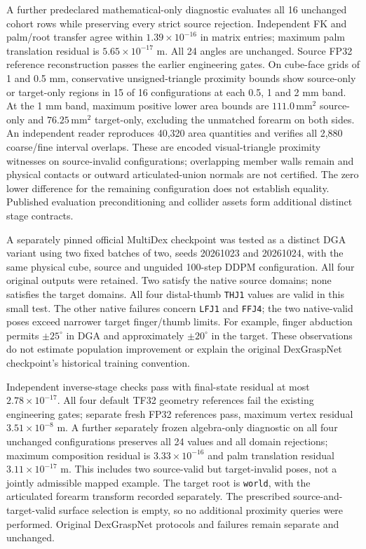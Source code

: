 \documentclass[10pt,letterpaper]{article}
\begin{document}
A further predeclared mathematical-only diagnostic evaluates all 16 unchanged
cohort rows while preserving every strict source rejection. Independent FK and
palm/root transfer agree within $1.39\times10^{-16}$ in matrix entries; maximum
palm translation residual is $5.65\times10^{-17}$ m. All 24 angles are unchanged.
Source FP32 reference reconstruction passes the earlier engineering gates.
On cube-face grids of 1 and 0.5 mm, conservative unsigned-triangle proximity
bounds show source-only or target-only regions in 15 of 16 configurations at
each 0.5, 1 and 2 mm band. At the 1 mm band, maximum positive lower area bounds
are $111.0\,\mathrm{mm}^2$ source-only and $76.25\,\mathrm{mm}^2$ target-only,
excluding the unmatched forearm on both sides. An independent reader reproduces
40,320 area quantities and verifies all 2,880 coarse/fine interval overlaps.
These are encoded visual-triangle proximity witnesses on source-invalid
configurations; overlapping member walls remain and physical contacts or
outward articulated-union normals are not certified. The zero lower difference
for the remaining configuration does not establish equality. Published evaluation
preconditioning and collider assets form additional distinct stage contracts.

A separately pinned official MultiDex checkpoint was tested as a distinct DGA
variant using two fixed batches of two, seeds 20261023 and 20261024, with the same
physical cube, source and unguided 100-step DDPM configuration. All four original
outputs were retained. Two satisfy the native source domains; none satisfies the
target domains. All four distal-thumb \texttt{THJ1} values are valid in this small
test. The other native failures concern \texttt{LFJ1} and \texttt{FFJ4}; the two
native-valid poses exceed narrower target finger/thumb limits. For example,
finger abduction permits $\pm25^\circ$ in DGA and approximately $\pm20^\circ$ in
the target. These observations do not estimate population improvement or explain
the original DexGraspNet checkpoint's historical training convention.

Independent inverse-stage checks pass with final-state residual at most
$2.78\times10^{-17}$. All four default TF32 geometry references fail the existing
engineering gates; separate fresh FP32 references pass, maximum vertex residual
$3.51\times10^{-8}$ m. A further separately frozen algebra-only diagnostic on all
four unchanged configurations preserves all 24 values and all domain rejections;
maximum composition residual is $3.33\times10^{-16}$ and palm translation
residual $3.11\times10^{-17}$ m. This includes two source-valid but target-invalid
poses, not a jointly admissible mapped example. The target root is \texttt{world},
with the articulated forearm transform recorded separately. The prescribed
source-and-target-valid surface selection is empty, so no additional proximity
queries were performed. Original DexGraspNet protocols and failures remain
separate and unchanged.
\end{document}
